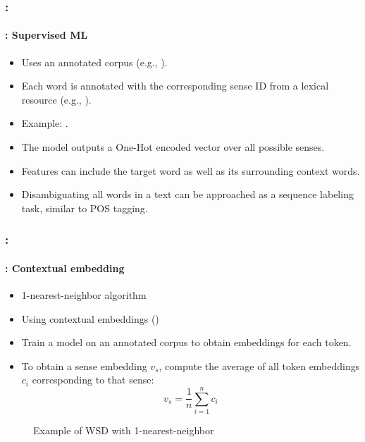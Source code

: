 \documentclass[xcolor=table]{beamer}
\begin{document}
\begin{frame}
	\frametitle{\insertshortsubtitle: \insertsection}
	\framesubtitle{\insertsubsection: Supervised ML}
	
	\begin{itemize}
		\item Uses an annotated corpus (e.g., ).
		\item Each word is annotated with the corresponding sense ID from a lexical resource (e.g., ).
		\item Example: .
		\item The model outputs a One-Hot encoded vector over all possible senses.
		\item Features can include the target word as well as its surrounding context words.
		\item Disambiguating all words in a text can be approached as a sequence labeling task, similar to POS tagging.
	\end{itemize}
	
\end{frame}

\begin{frame}
	\frametitle{\insertshortsubtitle: \insertsection}
	\framesubtitle{\insertsubsection: Contextual embedding}
	
	\begin{minipage}{.68\textwidth}
		\begin{itemize}
			\item 1-nearest-neighbor algorithm
			\item Using contextual embeddings ()
			\item Train a model on an annotated corpus to obtain embeddings for each token.
			\item To obtain a sense embedding $v_s$, compute the average of all token embeddings $c_i$ corresponding to that sense:
			\[
			v_s = \frac{1}{n} \sum_{i=1}^{n} c_i
			\] 
		\end{itemize}
	\end{minipage}
	\begin{minipage}{.3\textwidth}
		\begin{figure}
			\caption{Example of WSD with 1-nearest-neighbor \cite{2019-jurafsky-martin}}
		\end{figure}
	\end{minipage}
	
\end{frame}


\end{document}
